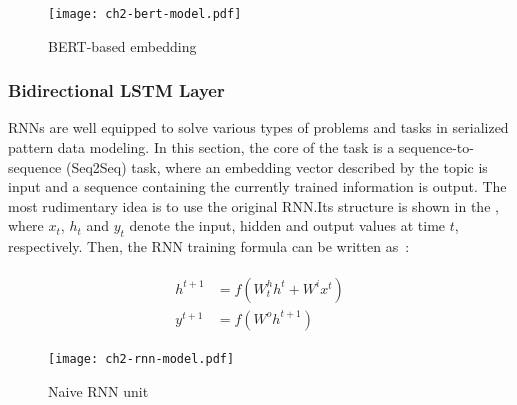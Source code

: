 \begin{figure}[htbp!]
    \centering
    \texttt{[image: ch2-bert-model.pdf]}
    \caption{BERT-based embedding}\label{fig:ch2-bert-model}
\end{figure}

\subsubsection{Bidirectional LSTM Layer}

RNNs are well equipped to solve various types of problems and tasks in serialized pattern data modeling. In this section, the core of the task is a sequence-to-sequence (Seq2Seq) task, where an embedding vector described by the topic is input and a sequence containing the currently trained information is output. The most rudimentary idea is to use the original RNN.\@ Its structure is shown in the \figname{\ref{fig:ch2-rnn-model}}, where \(x_t\), \(h_t\) and \(y_t\) denote the input, hidden and output values at time \(t\), respectively. Then, the RNN training formula can be written as~\eqname{\ref{fml:rnn-train}}:

\begin{align}\label{fml:rnn-train}
    \begin{split}
        h^{t+1} & =f(W^h_{t} h^t+W^i x^t) \\
        y^{t+1} & =f(W^o h^{t+1})
    \end{split}
\end{align}


\begin{figure}[htbp!]
    \centering
    \texttt{[image: ch2-rnn-model.pdf]}
    \caption{Naive RNN unit}\label{fig:ch2-rnn-model}
\end{figure}



